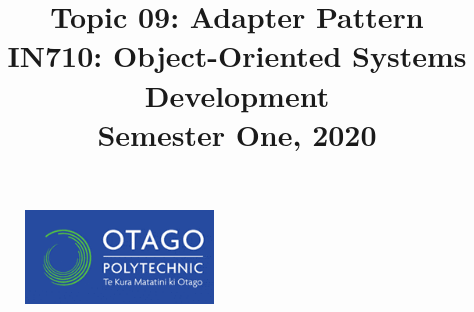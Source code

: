 \documentclass{article}
\author{}
\begin{document}
\begin{figure}
  \includegraphics[width=50mm]{../../resources/img/logo.png}
\end{figure}

\title{Topic 09: Adapter Pattern\\IN710: Object-Oriented Systems Development\\Semester One, 2020}
\date{}
\maketitle
\end{document}
